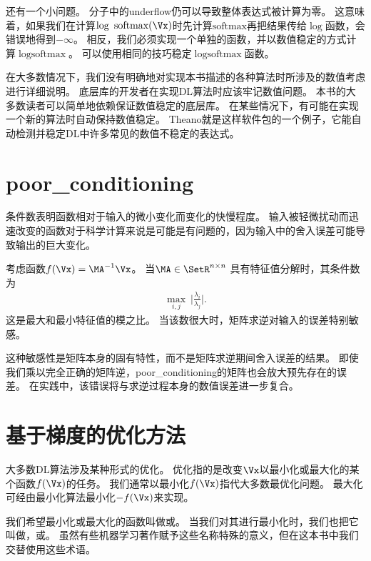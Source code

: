 还有一个小问题。
分子中的\gls{underflow}仍可以导致整体表达式被计算为零。
这意味着，如果我们在计算$\log ~\text{softmax}(\Vx)$时先计算$\text{softmax}$再把结果传给$\log$函数，会错误地得到$-\infty$。
相反，我们必须实现一个单独的函数，并以数值稳定的方式计算$\log \text{softmax}$。
可以使用相同的技巧稳定$\log \text{softmax}$函数。

在大多数情况下，我们没有明确地对实现本书描述的各种算法时所涉及的数值考虑进行详细说明。
底层库的开发者在实现\gls{DL}算法时应该牢记数值问题。
本书的大多数读者可以简单地依赖保证数值稳定的底层库。
在某些情况下，有可能在实现一个新的算法时自动保持数值稳定。
Theano\citep{bergstra+al:2010-scipy,Bastien-2012}就是这样软件包的一个例子，它能自动检测并稳定\gls{DL}中许多常见的数值不稳定的表达式。


\section{\gls{poor_conditioning}}
\label{sec:poor_conditioning}

条件数表明函数相对于输入的微小变化而变化的快慢程度。
输入被轻微扰动而迅速改变的函数对于科学计算来说是可能是有问题的，因为输入中的舍入误差可能导致输出的巨大变化。

考虑函数$f(\Vx) = \MA^{-1} \Vx$。
当$\MA \in \SetR^{n \times n}$ 具有特征值分解时，其条件数为
\begin{align}
 \underset{i,j}{\max}~ \Bigg| \frac{\lambda_i}{ \lambda_j} \Bigg|.
\end{align}
这是最大和最小特征值的模之比。
当该数很大时，矩阵求逆对输入的误差特别敏感。

这种敏感性是矩阵本身的固有特性，而不是矩阵求逆期间舍入误差的结果。
即使我们乘以完全正确的矩阵逆，\gls{poor_conditioning}的矩阵也会放大预先存在的误差。
在实践中，该错误将与求逆过程本身的数值误差进一步复合。



\section{基于梯度的优化方法}
\label{sec:gradient_based_optimization}

大多数\gls{DL}算法涉及某种形式的优化。
优化指的是改变$\Vx$以最小化或最大化的某个函数$f(\Vx)$的任务。
我们通常以最小化$f(\Vx)$指代大多数最优化问题。
最大化可经由最小化算法最小化$-f(\Vx)$来实现。

我们希望最小化或最大化的函数叫做或。
当我们对其进行最小化时，我们也把它叫做，或。
虽然有些机器学习著作赋予这些名称特殊的意义，但在这本书中我们交替使用这些术语。

